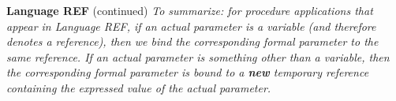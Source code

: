 \begin{minipage}[t]{\sw}
\slidenumber
\LARGE
{\bf Language REF} (continued)\exx
{\em To summarize: 
for procedure applications that appear in Language REF,
if an actual parameter is a variable
(and therefore denotes a reference),
then we bind the corresponding formal parameter to the same reference.
If an actual parameter is something other than a variable,
then the corresponding formal parameter is bound
to a {\bf new} temporary reference
containing the expressed value of the actual parameter.}
\end{minipage}
\clearpage
